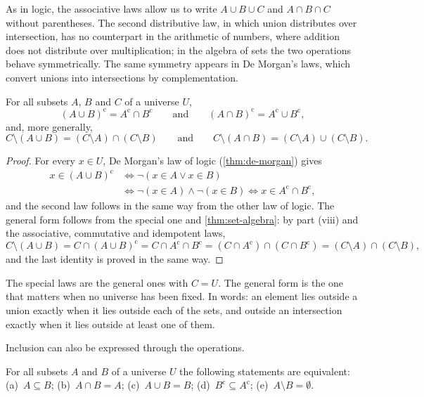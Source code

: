 As in logic, the associative laws allow us to write $A\cup B\cup C$ and $A\cap B\cap C$ without parentheses. The second distributive law, in which union distributes over intersection, has no counterpart in the arithmetic of numbers, where addition does not distribute over multiplication; in the algebra of sets the two operations behave symmetrically. The same symmetry appears in De Morgan's laws, which convert unions into intersections by complementation.

\begin{proposition}
\label{prop:de-morgan-sets}
For all subsets $A$, $B$ and $C$ of a universe $U$,
\[
(A\cup B)^{\mathrm c}=A^{\mathrm c}\cap B^{\mathrm c}
\qquad\text{and}\qquad
(A\cap B)^{\mathrm c}=A^{\mathrm c}\cup B^{\mathrm c},
\]
and, more generally,
\[
C\setminus(A\cup B)=(C\setminus A)\cap(C\setminus B)
\qquad\text{and}\qquad
C\setminus(A\cap B)=(C\setminus A)\cup(C\setminus B).
\]
\end{proposition}

\begin{proof}
For every $x\in U$, De Morgan's law of logic (\cref{thm:de-morgan}) gives
\begin{align*}
x\in(A\cup B)^{\mathrm c}
&\iff\neg(x\in A\vee x\in B)\\
&\iff\neg(x\in A)\wedge\neg(x\in B)
\iff x\in A^{\mathrm c}\cap B^{\mathrm c},
\end{align*}
and the second law follows in the same way from the other law of logic. The general form follows from the special one and \cref{thm:set-algebra}: by part (viii) and the associative, commutative and idempotent laws,
\[
C\setminus(A\cup B)=C\cap(A\cup B)^{\mathrm c}=C\cap A^{\mathrm c}\cap B^{\mathrm c}
=(C\cap A^{\mathrm c})\cap(C\cap B^{\mathrm c})=(C\setminus A)\cap(C\setminus B),
\]
and the last identity is proved in the same way.
\end{proof}

The special laws are the general ones with $C=U$. The general form is the one that matters when no universe has been fixed. In words: an element lies outside a union exactly when it lies outside each of the sets, and outside an intersection exactly when it lies outside at least one of them.

Inclusion can also be expressed through the operations.

\begin{proposition}
\label{prop:inclusion-equivalents}
For all subsets $A$ and $B$ of a universe $U$ the following statements are equivalent:
(a)~$A\subseteq B$; (b)~$A\cap B=A$; (c)~$A\cup B=B$; (d)~$B^{\mathrm c}\subseteq A^{\mathrm c}$; (e)~$A\setminus B=\emptyset$.
\end{proposition}

